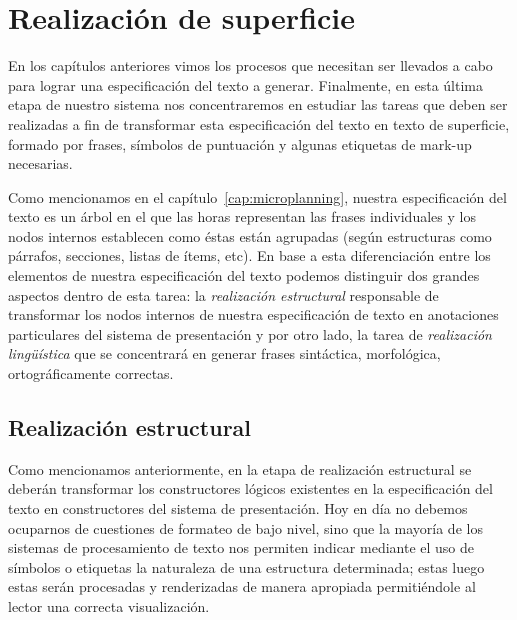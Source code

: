 \chapter{Realización de superficie}
\label{cap:realization}
En los capítulos anteriores vimos los procesos que necesitan ser llevados a cabo para lograr una especificación del texto a generar. Finalmente, en esta última etapa de nuestro sistema nos concentraremos en estudiar las tareas que deben ser realizadas a fin de transformar esta especificación del texto en texto de superficie, formado por frases, símbolos de puntuación y algunas etiquetas de mark-up necesarias.

Como mencionamos en el capítulo~\ref{cap:microplanning}, nuestra especificación del texto es un árbol en el que las horas representan las frases individuales y los nodos internos establecen como éstas están agrupadas (según estructuras como párrafos, secciones, listas de ítems, etc). En base a esta diferenciación entre los elementos de nuestra especificación del texto podemos distinguir dos grandes aspectos dentro de esta tarea: la \emph{realización estructural} responsable de transformar los nodos internos de nuestra especificación de texto en anotaciones particulares del sistema de presentación y por otro lado, la tarea de \emph{realización lingüística} que se concentrará en generar frases sintáctica, morfológica, ortográficamente correctas.

\section{Realización estructural}
\label{cap:structure_realization}


Como mencionamos anteriormente, en la etapa de realización estructural se deberán transformar los constructores lógicos existentes en la especificación del texto en constructores del sistema de presentación. Hoy en día no debemos ocuparnos de cuestiones de formateo de bajo nivel, sino que la mayoría de los sistemas de procesamiento de texto nos permiten indicar mediante el uso de símbolos o etiquetas la naturaleza de una estructura determinada; estas luego estas serán procesadas y renderizadas de manera apropiada permitiéndole al lector una correcta visualización.

